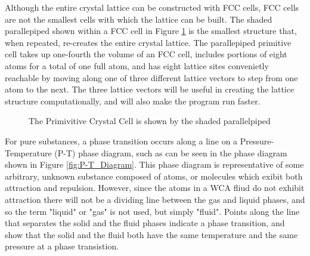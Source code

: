 \documentclass[12pt]{article}
\begin{document}
Although the entire crystal lattice can be constructed with FCC cells, FCC cells are not the smallest cells with which the lattice can be built. The shaded parallepiped shown within a FCC cell in Figure \ref{fig:primitivecell_firsttime} is the smallest structure that, when repeated, re-creates the entire crystal lattice. The parallepiped primitive cell takes up one-fourth the volume of an FCC cell, includes portions of eight atoms for a total of one full atom, and has eight lattice sites convenietly reachable by moving along one of three different lattice vectors to step from one atom to the next. The three lattice vectors will be useful in creating the lattice structure computationally, and will also make the program run faster.

  \begin{figure}[h!]
    \centering
    \caption{The Primivitive Crystal Cell is shown by the shaded parallelpiped}
    \label{fig:primitivecell_firsttime}
  \end{figure}

For pure substances, a phase transition occurs along a line on a Pressure-Temperature (P-T) phase diagram, such as can be seen in the phase diagram shown in Figure \ref{fig:P-T_Diagram}. This phase diagram is representative of some arbitrary, unknown substance composed of atoms, or molecules which exibit both attraction and repulsion. However, since the atoms in a WCA fliud do not exhibit attraction there will not be a dividing line between the gas and liquid phases, and so the term "liquid" or "gas" is not used, but simply "fluid". Points along the line that separates the solid and the fluid phases indicate a phase transition, and show that the solid and the fluid both have the same temperature and the same pressure at a phase transistion.
\end{document}
